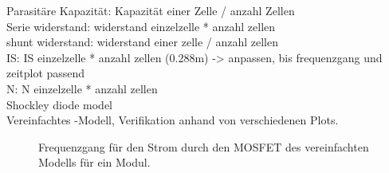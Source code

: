 Parasit\"are Kapazit\"at: Kapazit\"at einer Zelle / anzahl Zellen \\
Serie widerstand: widerstand einzelzelle * anzahl zellen \\
shunt widerstand: widerstand einer zelle / anzahl zellen \\
IS: IS einzelzelle * anzahl zellen (0.288m) -> anpassen, bis frequenzgang und zeitplot passend \\
N: N einzelzelle * anzahl zellen \\
Shockley diode model \\

Vereinfachtes  -Modell,  Verifikation anhand  von  verschiedenen
Plots.

\begin{figure}
   \caption{Frequenzgang f\"ur den Strom durch den MOSFET des vereinfachten Modells f\"ur ein Modul.}
   \label{fig:freqresponse:module:simple}
\end{figure}

